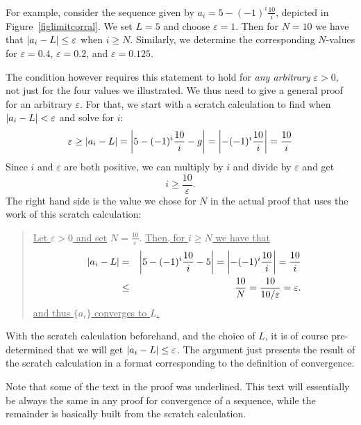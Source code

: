 For example, consider the sequence given by 
$a_i=5-(-1)^i\frac{10}{i}$, depicted in Figure~\ref{figlimitcorral}. We set
$L=5$ and choose $\varepsilon=1$. Then for $N=10$ we have
that $\left|a_i-L\right|\le\varepsilon$ when $i\ge N$. Similarly, we
determine the corresponding $N$-values for $\varepsilon=0.4$,
$\varepsilon=0.2$, and $\varepsilon=0.125$.

The condition however requires this statement to hold for {\em any
arbitrary} $\varepsilon>0$, not just for the four values we illustrated. We
thus need to give a general proof for an arbitrary $\varepsilon$. For that,
we start with a scratch calculation to find when $\left|a_i-L\right|<\varepsilon$
and solve for $i$:
\[
\varepsilon\ge \left|a_i-L\right|=\left|5-(-1)^i\frac{10}{i}-g\right|=\left|-(-1)^i\frac{10}{i}\right|=
\frac{10}{i}
\]
Since $i$ and $\varepsilon$ are both positive, we can multiply by $i$ and
divide by $\varepsilon$ and get
\[
i\ge\frac{10}{\varepsilon}.
\]
The right hand side is the value we chose for $N$ in the actual proof that
uses the work of this scratch calculation:

\begin{quote}
\underline{Let $\varepsilon>0$ and set} $N=\frac{10}{\varepsilon}$.
\underline{Then, for $i\ge N$ we have that}
\begin{eqnarray*}
\left|a_i-L\right|&=&\left|5-(-1)^i\frac{10}{i}-5\right|=\left|-(-1)^i\frac{10}{i}\right|=
\frac{10}{i}\\
&\le&\frac{10}{N}=\frac{10}{10/\varepsilon}=\varepsilon.
\end{eqnarray*}
\underline{and thus $\{a_i\}$ converges to $L$.}
\end{quote}

With the scratch calculation beforehand, and the choice of $L$, it is of
course pre-determined that we will get $\left|a_i-L\right|\le\varepsilon$. The
argument just presents the result of the scratch calculation in a format
corresponding to the definition of convergence.

Note that some of the text in the proof was underlined. This text will
essentially be always the same in any proof for convergence of a sequence,
while the remainder is basically built from the scratch calculation.

